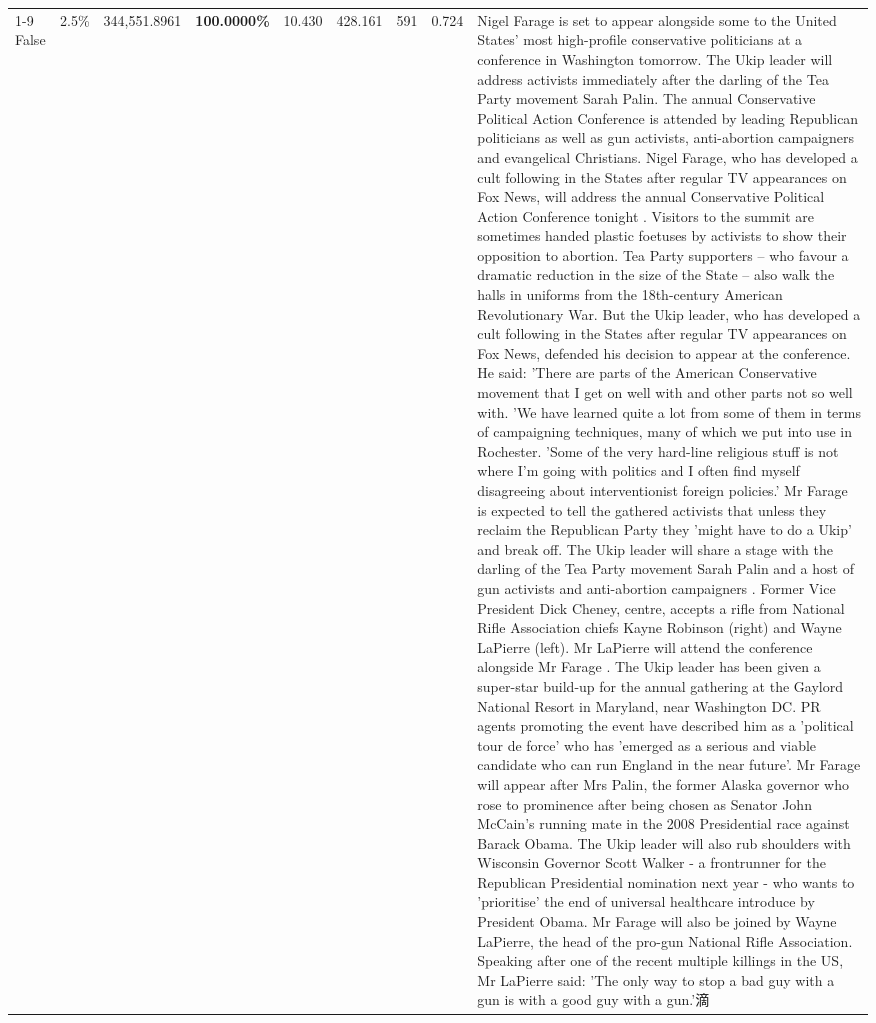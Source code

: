 \begin{table}[H]
\begin{tabular}{lllrlllll}
\cline{1-9}
False & 2.5\% & 344,551.8961 & \bfseries \color{red} 100.0000\% & 10.430 & 428.161 & 591 & 0.724 & Nigel Farage is set to appear alongside some to the United States' most high-profile conservative politicians at a conference in Washington tomorrow. The Ukip leader will address activists immediately after the darling of the Tea Party movement Sarah Palin. The annual Conservative Political Action Conference is attended by leading Republican politicians as well as gun activists, anti-abortion campaigners and evangelical Christians. Nigel Farage, who has developed a cult following in the States after regular TV appearances on Fox News, will address the annual Conservative Political Action Conference tonight . Visitors to the summit are sometimes handed plastic foetuses by activists to show their opposition to abortion. Tea Party supporters – who favour a dramatic reduction in the size of the State – also walk the halls in uniforms from the 18th-century American Revolutionary War. But the Ukip leader, who has developed a cult following in the States after regular TV appearances on Fox News, defended his decision to appear at the conference. He said: 'There are parts of the American Conservative movement that I get on well with and other parts not so well with. 'We have learned quite a lot from some of them in terms of campaigning techniques, many of which we put into use in Rochester. 'Some of the very hard-line religious stuff is not where I'm going with politics and I often find myself disagreeing about interventionist foreign policies.' Mr Farage is expected to tell the gathered activists that unless they reclaim the Republican Party they 'might have to do a Ukip' and break off. The Ukip leader will share a stage with the darling of the Tea Party movement Sarah Palin and a host of gun activists and anti-abortion campaigners . Former Vice President Dick Cheney, centre, accepts a rifle from National Rifle Association chiefs Kayne Robinson (right) and Wayne LaPierre (left). Mr LaPierre will attend the conference alongside Mr Farage . The Ukip leader has been given a super-star build-up for the annual gathering at the Gaylord National Resort in Maryland, near Washington DC. PR agents promoting the event have described him as a 'political tour de force' who has 'emerged as a serious and viable candidate who can run England in the near future'. Mr Farage will appear after Mrs Palin, the former Alaska governor who rose to prominence after being chosen as Senator John McCain's running mate in the 2008 Presidential race against Barack Obama. The Ukip leader will also rub shoulders with Wisconsin Governor Scott Walker - a frontrunner for the Republican Presidential nomination next year - who wants to 'prioritise' the end of universal healthcare introduce by President Obama. Mr Farage will also be joined by Wayne LaPierre, the head of the pro-gun National Rifle Association. Speaking after one of the recent multiple killings in the US, Mr LaPierre said: 'The only way to stop a bad guy with a gun is with a good guy with a gun.'滴 \\

\end{tabular}
\end{table}
